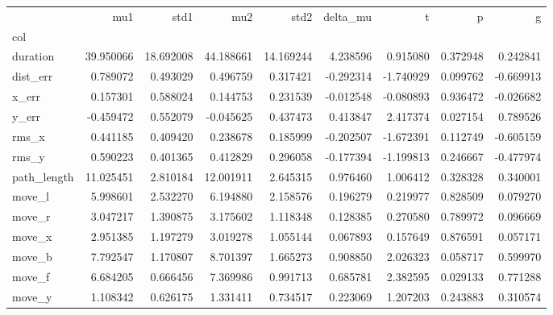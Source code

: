 \begin{tabular}{lrrrrrrrr}
\toprule
{} &                  mu1 &       std1 &        mu2 &       std2 & delta\_mu &         t &         p &         g \\
col          &            &            &            &            &           &           &           &           \\
\midrule
duration     &  39.950066 &  18.692008 &  44.188661 &  14.169244 &  4.238596 &  0.915080 &  0.372948 &  0.242841 \\
dist\_err    &   0.789072 &   0.493029 &   0.496759 &   0.317421 & -0.292314 & -1.740929 &  0.099762 & -0.669913 \\
x\_err       &   0.157301 &   0.588024 &   0.144753 &   0.231539 & -0.012548 & -0.080893 &  0.936472 & -0.026682 \\
y\_err       &  -0.459472 &   0.552079 &  -0.045625 &   0.437473 &  0.413847 &  2.417374 &  0.027154 &  0.789526 \\
rms\_x       &   0.441185 &   0.409420 &   0.238678 &   0.185999 & -0.202507 & -1.672391 &  0.112749 & -0.605159 \\
rms\_y       &   0.590223 &   0.401365 &   0.412829 &   0.296058 & -0.177394 & -1.199813 &  0.246667 & -0.477974 \\
path\_length &  11.025451 &   2.810184 &  12.001911 &   2.645315 &  0.976460 &  1.006412 &  0.328328 &  0.340001 \\
move\_l      &   5.998601 &   2.532270 &   6.194880 &   2.158576 &  0.196279 &  0.219977 &  0.828509 &  0.079270 \\
move\_r      &   3.047217 &   1.390875 &   3.175602 &   1.118348 &  0.128385 &  0.270580 &  0.789972 &  0.096669 \\
move\_x      &   2.951385 &   1.197279 &   3.019278 &   1.055144 &  0.067893 &  0.157649 &  0.876591 &  0.057171 \\
move\_b      &   7.792547 &   1.170807 &   8.701397 &   1.665273 &  0.908850 &  2.026323 &  0.058717 &  0.599970 \\
move\_f      &   6.684205 &   0.666456 &   7.369986 &   0.991713 &  0.685781 &  2.382595 &  0.029133 &  0.771288 \\
move\_y      &   1.108342 &   0.626175 &   1.331411 &   0.734517 &  0.223069 &  1.207203 &  0.243883 &  0.310574 \\
\bottomrule
\end{tabular}
